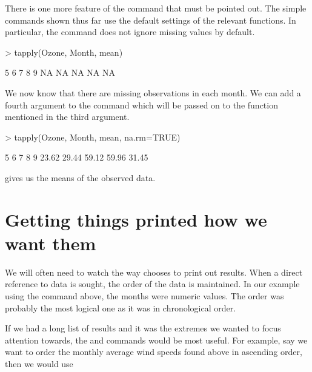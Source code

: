 There is one more feature of the  command that must be pointed out. The simple commands shown thus far use the default settings of the relevant functions. In particular, the  command does not ignore missing values by default. 

\begin{Schunk}
\begin{Sinput}
> tapply(Ozone, Month, mean) 
\end{Sinput}
\begin{Soutput}
 5  6  7  8  9 
NA NA NA NA NA 
\end{Soutput}
\end{Schunk}

We now know that there are missing  observations in each month. We can add a fourth argument to the command which will be passed on to the function mentioned in the third argument. 

\begin{Schunk}
\begin{Sinput}
> tapply(Ozone, Month, mean, na.rm=TRUE) 
\end{Sinput}
\begin{Soutput}
    5     6     7     8     9 
23.62 29.44 59.12 59.96 31.45 
\end{Soutput}
\end{Schunk}

gives us the means of the observed data. 
 
\section{Getting things printed how we want them} 
 
We will often need to watch the way \R{} chooses to print out results. When a direct reference to data is sought, the order of the data is maintained. In our example using the  command above, the months were numeric values. The order was probably the most logical one as it was in chronological order. 
 
If we had a long list of results and it was the extremes we wanted to focus attention towards, the  and  commands would be most useful. For example, say we want to order the monthly average wind speeds found above in ascending order, then we would use 

